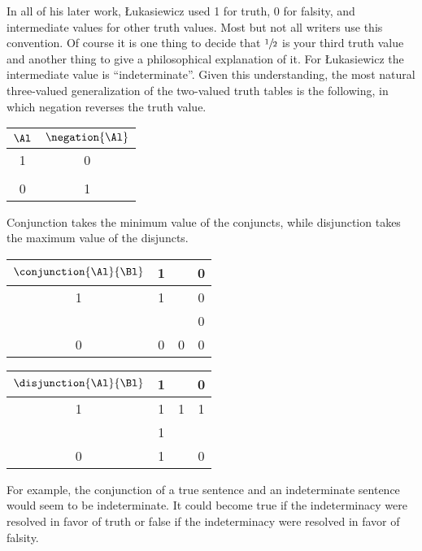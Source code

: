 In all of his later work, \L{}ukasiewicz used 1 for truth, 0 for falsity, and intermediate values for other truth values. 
Most but not all writers use this convention. 
Of course it is one thing to decide that $\sfrac{1}{2}$ is your third truth value and another thing to give a philosophical explanation of it. 
For \L{}ukasiewicz the intermediate value is ``indeterminate''. 
Given this understanding, the most natural three-valued generalization of the two-valued truth tables is the following, in which negation reverses the truth value.
\begin{center}
	\begin{tabular}{ | c | c |}
		\hline
		$\Al$ & $\negation{\Al}$ \\ \hline
		1 & 0 \\ \hline
		\textonehalf{} & \textonehalf{} \\ \hline
		0 & 1 \\ \hline
	\end{tabular}		
\end{center}
Conjunction takes the minimum value of the conjuncts, while disjunction takes the maximum value of the disjuncts.
\begin{center}
	\begin{tabular}{ | c | c | c | c |}
		\hline
		$\conjunction{\Al}{\Bl}$ & 1 & \textonehalf{} & 0 \\ \hline
		1 & 1 & \textonehalf{} & 0 \\ \hline
		\textonehalf{} & \textonehalf{} & \textonehalf{} & 0 \\ \hline
		0 & 0 & 0 & 0 \\ \hline
	\end{tabular}		
\end{center}
\begin{center}
	\begin{tabular}{ | c | c | c | c |}
		\hline
		$\disjunction{\Al}{\Bl}$ & 1 & \textonehalf{} & 0 \\ \hline
		1 & 1 & 1 & 1 \\ \hline
		\textonehalf{} & 1 & \textonehalf{} & \textonehalf{} \\ \hline
		0 & 1 & \textonehalf{} & 0 \\ \hline
	\end{tabular}		
\end{center}
For example, the conjunction of a true sentence and an indeterminate sentence would seem to be indeterminate. 
It could become true if the indeterminacy were resolved in favor of truth or false if the indeterminacy were resolved in favor of falsity. 

